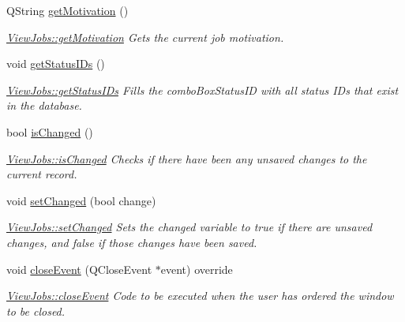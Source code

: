 \begin{DoxyCompactItemize}
Q\+String \hyperlink{class_view_jobs_a238ec5365ef2c39baa97670769dfedca}{get\+Motivation} ()
\begin{DoxyCompactList}\small\item\em \hyperlink{class_view_jobs_a238ec5365ef2c39baa97670769dfedca}{View\+Jobs\+::get\+Motivation} Gets the current job motivation. \end{DoxyCompactList}\item 
\mbox{\label{class_view_jobs_adabe196e81c74d17c436de1a6ea12099}} 
void \hyperlink{class_view_jobs_adabe196e81c74d17c436de1a6ea12099}{get\+Status\+I\+Ds} ()
\begin{DoxyCompactList}\small\item\em \hyperlink{class_view_jobs_adabe196e81c74d17c436de1a6ea12099}{View\+Jobs\+::get\+Status\+I\+Ds} Fills the combo\+Box\+Status\+ID with all status I\+Ds that exist in the database. \end{DoxyCompactList}\item 
bool \hyperlink{class_view_jobs_a5f75b45d28ce7f4a8050ce9ce0f44350}{is\+Changed} ()
\begin{DoxyCompactList}\small\item\em \hyperlink{class_view_jobs_a5f75b45d28ce7f4a8050ce9ce0f44350}{View\+Jobs\+::is\+Changed} Checks if there have been any unsaved changes to the current record. \end{DoxyCompactList}\item 
void \hyperlink{class_view_jobs_a3cba868c6deadaf4b35c18982f7ec35e}{set\+Changed} (bool change)
\begin{DoxyCompactList}\small\item\em \hyperlink{class_view_jobs_a3cba868c6deadaf4b35c18982f7ec35e}{View\+Jobs\+::set\+Changed} Sets the changed variable to true if there are unsaved changes, and false if those changes have been saved. \end{DoxyCompactList}\item 
void \hyperlink{class_view_jobs_a832503ca9eb4e4bf79c2fb48a59141aa}{close\+Event} (Q\+Close\+Event $\ast$event) override
\begin{DoxyCompactList}\small\item\em \hyperlink{class_view_jobs_a832503ca9eb4e4bf79c2fb48a59141aa}{View\+Jobs\+::close\+Event} Code to be executed when the user has ordered the window to be closed. \end{DoxyCompactList}\end{DoxyCompactItemize}


